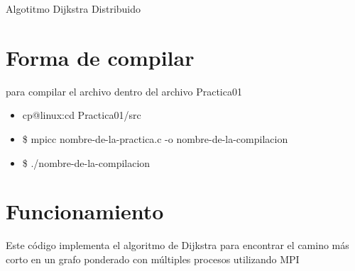 \documentclass[a4paper,12pt]{article}
\begin{document}

\newpage



\newpage

\begin{center}
    {\Large Algotitmo Dijkstra Distribuido}
\end{center}

\section*{Forma de compilar}
para compilar el archivo dentro del archivo Practica01
\begin{itemize}
   \item[ ] cp@linux:cd Practica01/src
   \item[ ] \$ mpicc nombre-de-la-practica.c -o nombre-de-la-compilacion
   \item[ ] \$ ./nombre-de-la-compilacion
\end{itemize}

\section*{Funcionamiento}

Este código implementa el algoritmo de Dijkstra para encontrar el camino más corto en un grafo ponderado con múltiples procesos utilizando MPI
\end{document}
